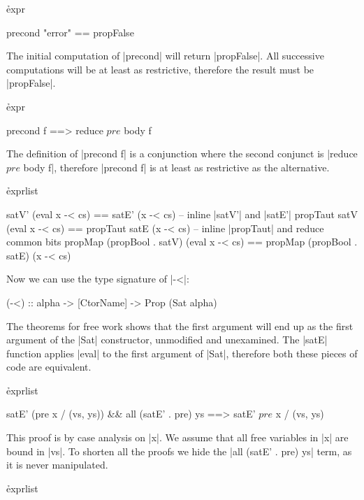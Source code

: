 
\h{expr}\begin{code}
precond "error" == propFalse
\end{code}

The initial computation of |precond| will return |propFalse|. All successive computations will be at least as restrictive, therefore the result must be |propFalse|.


\h{expr}\begin{code}
precond f ==> reduce $ pre $ body f
\end{code}

The definition of |precond f| is a conjunction where the second conjunct is |reduce $ pre $ body f|, therefore |precond f| is at least as restrictive as the alternative.



\h{exprlist}\begin{code}
satV' (eval x -< cs) == satE' (x -< cs)
    -- inline |satV'| and |satE'|
propTaut satV (eval x -< cs) == propTaut satE (x -< cs)
    -- inline |propTaut| and reduce common bits
propMap (propBool . satV) (eval x -< cs) == propMap (propBool . satE) (x -< cs)
\end{code}

Now we can use the type signature of |-<|:

\begin{code}
(-<) :: alpha -> [CtorName] -> Prop (Sat alpha)
\end{code}

The theorems for free work \cite{wadler:theorems} shows that the first argument will end up as the first argument of the |Sat| constructor, unmodified and unexamined. The |satE| function applies |eval| to the first argument of |Sat|, therefore both these pieces of code are equivalent.



\h{exprlist}\begin{code}
satE' (pre x / (vs, ys)) && all (satE' . pre) ys ==> satE' $ pre $ x / (vs, ys)
\end{code}

This proof is by case analysis on |x|. We assume that all free variables in |x| are bound in |vs|. To shorten all the proofs we hide the |all (satE' . pre) ys| term, as it is never manipulated.


\h{exprlist}

